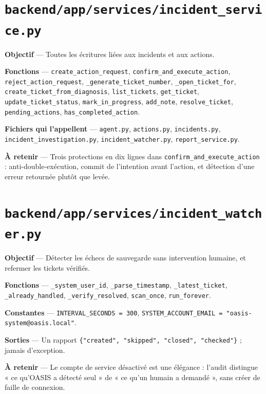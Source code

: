 \documentclass[11pt,a4paper]{report}
\newcommand{\file}[1]{\texttt{\small #1}}
\newcommand{\fn}[1]{\texttt{\small\textcolor{oasisviolet}{#1}}}
\begin{document}
\section{\file{backend/app/services/incident\_service.py}}

\textbf{Objectif} --- Toutes les écritures liées aux incidents et aux actions.

\textbf{Fonctions} --- \fn{create\_action\_request},
\fn{confirm\_and\_execute\_action}, \fn{reject\_action\_request},
\fn{\_generate\_ticket\_number}, \fn{\_open\_ticket\_for},
\fn{create\_ticket\_from\_diagnosis}, \fn{list\_tickets}, \fn{get\_ticket},
\fn{update\_ticket\_status}, \fn{mark\_in\_progress}, \fn{add\_note},
\fn{resolve\_ticket}, \fn{pending\_actions}, \fn{has\_completed\_action}.

\textbf{Fichiers qui l'appellent} --- \file{agent.py}, \file{actions.py},
\file{incidents.py}, \file{incident\_investigation.py},
\file{incident\_watcher.py}, \file{report\_service.py}.

\textbf{À retenir} --- Trois protections en dix lignes dans
\fn{confirm\_and\_execute\_action} : anti-double-exécution, commit de
l'intention avant l'action, et détection d'une erreur retournée plutôt que
levée.

\section{\file{backend/app/services/incident\_watcher.py}}

\textbf{Objectif} --- Détecter les échecs de sauvegarde sans intervention
humaine, et refermer les tickets vérifiés.

\textbf{Fonctions} --- \fn{\_system\_user\_id}, \fn{\_parse\_timestamp},
\fn{\_latest\_ticket}, \fn{\_already\_handled}, \fn{\_verify\_resolved},
\fn{scan\_once}, \fn{run\_forever}.

\textbf{Constantes} --- \texttt{INTERVAL\_SECONDS = 300},
\texttt{SYSTEM\_ACCOUNT\_EMAIL = "oasis-system@oasis.local"}.

\textbf{Sorties} --- Un rapport
\texttt{\{"created", "skipped", "closed", "checked"\}} ; jamais d'exception.

\textbf{À retenir} --- Le compte de service désactivé est une élégance :
l'audit distingue « ce qu'OASIS a détecté seul » de « ce qu'un humain a
demandé », sans créer de faille de connexion.
\end{document}
